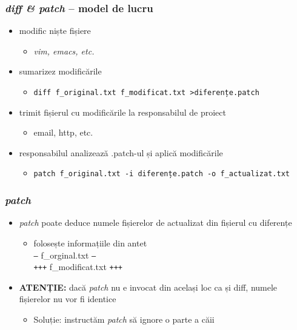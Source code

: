 \documentclass{beamer}
\begin{document}
\begin{frame}
  \frametitle{\textit{diff \& patch} – model de lucru}
  \begin{itemize}[<+->]
  \item modific niște fișiere
    \begin{itemize}
      \item \textit{vim, emacs, etc.}
    \end{itemize}
  \item sumarizez modificările
    \begin{itemize}
    \item \scriptsize{\texttt{diff f\_original.txt f\_modificat.txt \textgreater diferențe.patch}}
    \end{itemize}
  \item trimit fișierul cu modificările la responsabilul de proiect
    \begin{itemize}
    \item email, http, etc.
    \end{itemize}
  \item responsabilul analizează .patch-ul și aplică modificările
    \begin{itemize}
    \item \scriptsize{\texttt{patch f\_original.txt -i diferențe.patch -o f\_actualizat.txt}}
    \end{itemize}

  \end{itemize}
\end{frame}


\begin{frame}
  \frametitle{\textit{patch}}
  \begin{itemize}[<+->]

  \item \textit{patch} poate deduce numele fișierelor de actualizat din fișierul cu diferențe
    \begin{itemize}
    \item folosește informațiile din antet \\
      \texttt{---} f\_orginal.txt \texttt{---} \\
      \texttt{+++} f\_modificat.txt \texttt{+++}
    \end{itemize}

  \item \textbf{ATENȚIE: } dacă \textit{patch} nu e invocat din același loc ca și diff, numele fișierelor nu vor fi identice
    \begin{itemize}
    \item Soluție: instructăm \textit{patch} să ignore o parte a căii
    \end{itemize}
  \end{itemize}
\end{frame}
\end{document}

